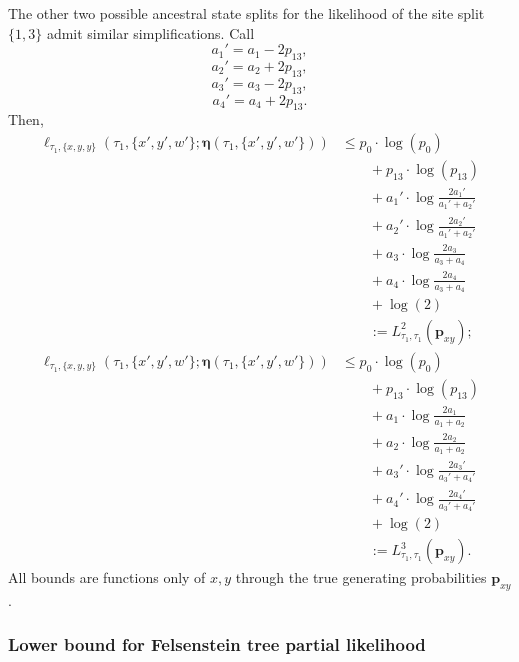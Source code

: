 \documentclass{article}
\newcommand{\fullAncestralSplitPartitions}{\boldsymbol\eta}
\begin{document}
The other two possible ancestral state splits for the likelihood of the site split $\{1,3\}$ admit similar simplifications.
Call
$$
a_{1}' = a_{1}-2p_{13},
$$
$$
a_{2}' = a_{2}+2p_{13},
$$
$$
a_{3}' = a_{3}-2p_{13},
$$
$$
a_{4}' = a_{4}+2p_{13}.
$$
Then,
\begin{align*}
    \ell_{\tau_1,\{x,y,y\}}(\tau_1, \{x',y',w'\}; \fullAncestralSplitPartitions(\tau_1,\{x',y',w'\}))
    &\le      p_{0}  \cdot\log(p_{0}) \\
    &\qquad + p_{13} \cdot\log(p_{13}) \\
    &\qquad + a_{1}'\cdot\log\frac{2a_{1}'}{a_{1}'+a_{2}'} \\
    &\qquad + a_{2}'\cdot\log\frac{2a_{2}'}{a_{1}'+a_{2}'} \\
    &\qquad + a_{3}\cdot\log\frac{2a_{3}}{a_{3}+a_{4}} \\
    &\qquad + a_{4}\cdot\log\frac{2a_{4}}{a_{3}+a_{4}} \\
    &\qquad + \log(2) \\
    &\qquad := L^{2}_{\tau_1,\tau_1}(\mathbf{p}_{xy});
\end{align*}
\begin{align*}
    \ell_{\tau_1,\{x,y,y\}}(\tau_1, \{x',y',w'\}; \fullAncestralSplitPartitions(\tau_1,\{x',y',w'\}))
    &\le      p_{0}  \cdot\log(p_{0}) \\
    &\qquad + p_{13} \cdot\log(p_{13}) \\
    &\qquad + a_{1}\cdot\log\frac{2a_{1}}{a_{1}+a_{2}} \\
    &\qquad + a_{2}\cdot\log\frac{2a_{2}}{a_{1}+a_{2}} \\
    &\qquad + a_{3}'\cdot\log\frac{2a_{3}'}{a_{3}'+a_{4}'} \\
    &\qquad + a_{4}'\cdot\log\frac{2a_{4}'}{a_{3}'+a_{4}'} \\
    &\qquad + \log(2) \\
    &\qquad := L^{3}_{\tau_1,\tau_1}(\mathbf{p}_{xy}).
\end{align*}
All bounds are functions only of $x,y$ through the true generating probabilities $\mathbf{p}_{xy}$.

\subsubsection{Lower bound for Felsenstein tree partial likelihood}
\end{document}
